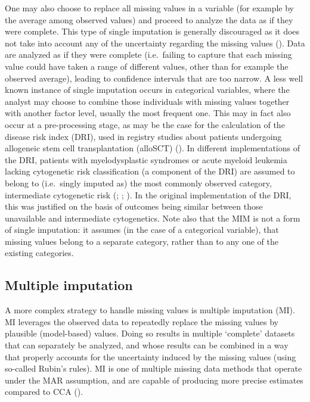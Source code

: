 \documentclass[
  letterpaper,
  DIV=11,
  numbers=noendperiod]{scrreprt}
\begin{document}
One may also choose to replace all missing values in a variable (for
example by the average among observed values) and proceed to analyze the
data as if they were complete. This type of single imputation is
generally discouraged as it does not take into account any of the
uncertainty regarding the missing values
(). Data are analyzed as if they were complete (i.e.~failing
to capture that each missing value could have taken a range of different
values, other than for example the observed average), leading to
confidence intervals that are too narrow. A less well known instance of
single imputation occurs in categorical variables, where the analyst may
choose to combine those individuals with missing values together with
another factor level, usually the most frequent one. This may in fact
also occur at a pre-processing stage, as may be the case for the
calculation of the disease risk index (DRI), used in registry studies
about patients undergoing allogeneic stem cell transplantation (alloSCT)
(). In different implementations of the DRI, patients with
myelodysplastic syndromes or acute myeloid leukemia lacking cytogenetic
risk classification (a component of the DRI) are assumed to belong to
(i.e.~singly imputed as) the most commonly observed category,
intermediate cytogenetic risk
(;
;
). In the original implementation of the DRI, this was
justified on the basis of outcomes being similar between those
unavailable and intermediate cytogenetics. Note also that the MIM is not
a form of single imputation: it assumes (in the case of a categorical
variable), that missing values belong to a separate category, rather
than to any one of the existing categories.

\subsection{Multiple imputation}\label{multiple-imputation-1}

A more complex strategy to handle missing values is multiple imputation
(MI). MI leverages the observed data to repeatedly replace the missing
values by plausible (model-based) values. Doing so results in multiple
`complete' datasets that can separately be analyzed, and whose results
can be combined in a way that properly accounts for the uncertainty
induced by the missing values (using so-called Rubin's rules). MI is one
of multiple missing data methods that operate under the MAR assumption,
and are capable of producing more precise estimates compared to CCA
().
\end{document}
